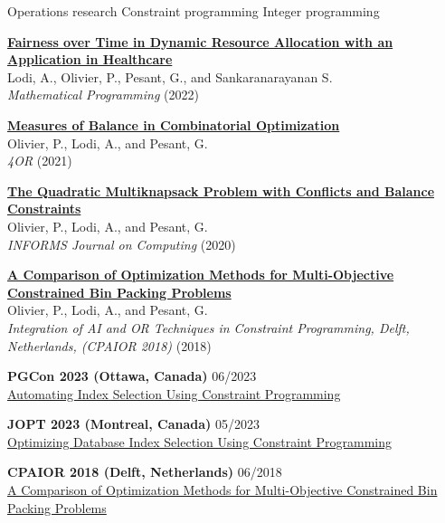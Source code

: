 \documentclass{memoir}
\begin{document}
\begin{list}{}
  
  \BulletItem Operations research
  \BulletItem Constraint programming
  \BulletItem Integer programming

  

  \Item \href{https://doi.org/10.1007/s10107-022-01904-6}{\textbf{Fairness over Time in Dynamic Resource Allocation with an Application in Healthcare}} \\
  Lodi, A., Olivier, P., Pesant, G., and Sankaranarayanan S. \\
  \emph{Mathematical Programming} (2022)

  \Item \href{https://doi.org/10.1007/s10288-021-00486-x}{\textbf{Measures of Balance in Combinatorial Optimization}} \\
  Olivier, P., Lodi, A., and Pesant, G. \\
  \emph{4OR} (2021)

  \Item \href{https://doi.org/10.1287/ijoc.2020.0983}{\textbf{The Quadratic Multiknapsack Problem with Conflicts and Balance Constraints}} \\
  Olivier, P., Lodi, A., and Pesant, G. \\
  \emph{INFORMS Journal on Computing} (2020)

  \Item \href{https://doi.org/10.1007/978-3-319-93031-2_33}{\textbf{A Comparison of Optimization Methods for Multi-Objective Constrained Bin Packing Problems}} \\
  Olivier, P., Lodi, A., and Pesant, G. \\
  \emph{Integration of AI and OR Techniques in Constraint Programming, Delft, Netherlands, (CPAIOR 2018)} (2018)


  \Item \textbf{PGCon 2023 (Ottawa, Canada)} \hfill 06/2023 \\
  \href{https://www.pgcon.org/events/pgcon_2023/schedule/session/422-automating-index-selection-using-constraint-programming/}{Automating Index Selection Using Constraint Programming}

  \Item \textbf{JOPT 2023 (Montreal, Canada)} \hfill 05/2023 \\
  \href{https://symposia.cirrelt.ca/CORS-JOPT/fr/schedule?slot_id=2207}{Optimizing Database Index Selection Using Constraint Programming}
  
  \Item \textbf{CPAIOR 2018 (Delft, Netherlands)} \hfill 06/2018 \\
  \href{http://icaps18.icaps-conference.org/schedule}{A Comparison of Optimization Methods for Multi-Objective Constrained Bin Packing Problems}


\end{list}
\end{document}

